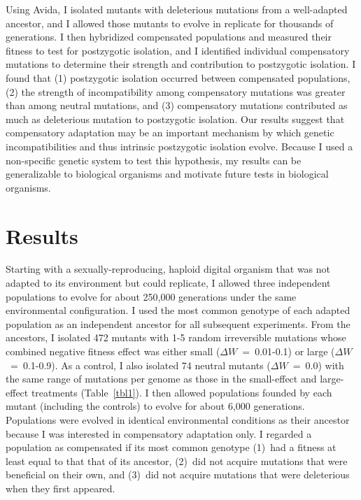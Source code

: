 \begin{doublespace}
Using Avida, I isolated mutants with deleterious mutations
from a well-adapted ancestor, and I allowed those mutants to evolve
in replicate for thousands of generations.
%
I then hybridized compensated populations and measured their fitness
to test for postzygotic isolation,
and I identified individual compensatory mutations to determine
their strength and contribution to postzygotic isolation.
%
I found that (1) postzygotic isolation occurred between compensated populations,
(2) the strength of incompatibility among compensatory mutations
was greater than among neutral mutations, and
(3) compensatory mutations contributed as much as deleterious mutation
to postzygotic isolation.
%
Our results suggest that compensatory adaptation may be an important
mechanism by which genetic incompatibilities and
thus intrinsic postzygotic isolation evolve.
%
Because I used a non-specific genetic system to test this hypothesis,
my results can be generalizable to biological organisms and motivate
future tests in biological organisms.



\section{Results}

Starting with a sexually-reproducing, haploid digital organism
that was not adapted to its environment but could replicate,
I allowed three independent populations to evolve
for about 250,000 generations under the same environmental configuration.
%
I used the most common genotype of each adapted population
as an independent ancestor for all subsequent experiments.
%
From the ancestors, I isolated 472 mutants
with 1-5 random irreversible mutations
whose combined negative fitness effect was either
small ($\Delta W$~=~0.01-0.1) or large ($\Delta W$~=~0.1-0.9).
%
As a control, I also isolated 74 neutral mutants ($\Delta W$~=~0.0)
with the same range of mutations per genome as those
in the small-effect and large-effect treatments (Table~\ref{tbl1}).
%
I then allowed populations founded by each mutant (including the controls)
to evolve for about 6,000 generations.
%
Populations were evolved in identical environmental conditions
as their ancestor because I was interested in compensatory adaptation only.
%
I regarded a population as compensated if its most common genotype
(1)~had a fitness at least equal to that that of its ancestor,
(2)~did not acquire mutations that were beneficial on their own, and
(3)~did not acquire mutations that were deleterious when they first appeared.




\end{doublespace}
